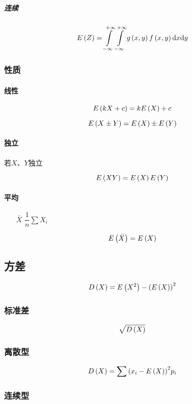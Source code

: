\documentclass{article}
\begin{document}
\subparagraph{连续}

\[E\left(Z\right)=\int\limits_{-\infty}^{+\infty}\int\limits_{-\infty}^{+\infty} g\left(x,y\right)f\left(x,y\right)\mathrm d x\mathrm d y\]

\subsubsection{性质}

\paragraph{线性}

\[E\left(kX+c\right)=kE\left(X\right)+c\]

\[E\left(X\pm Y\right)=E\left(X\right)\pm E\left(Y\right)\]

\paragraph{独立}

若$X$、$Y$独立

\[E\left(XY\right)=E\left(X\right)E\left(Y\right)\]

\paragraph{平均}

\begin{enumerate}
    \item [$\bar X$]$\dfrac1n\sum X_i$
\end{enumerate}

\[E\left(\bar X\right)=E\left(X\right)\]

\subsection{方差}

\[D\left(X\right)=E\left(X^2\right)-{\left(E\left(X\right)\right)}^2\]

\subsubsection{标准差}

\[\sqrt{D\left(X\right)}\]

\subsubsection{离散型}

\[D\left(X\right)=\sum{\left(x_i-E\left(X\right)\right)}^2p_i\]

\subsubsection{连续型}
\end{document}
